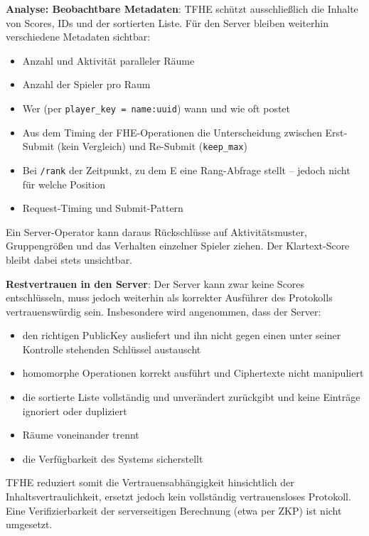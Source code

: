 \textbf{Analyse: Beobachtbare Metadaten}:
TFHE schützt ausschließlich die Inhalte von Scores, IDs und der sortierten Liste. Für den Server bleiben weiterhin verschiedene Metadaten sichtbar:
\begin{itemize}
    \item Anzahl und Aktivität paralleler Räume
    \item Anzahl der Spieler pro Raum
    \item Wer (per \texttt{player\_key = name:uuid}) wann und wie oft postet
    \item Aus dem Timing der FHE-Operationen die Unterscheidung zwischen Erst-Submit (kein Vergleich) und Re-Submit (\texttt{keep\_max})
    \item Bei \texttt{/rank} der Zeitpunkt, zu dem E eine Rang-Abfrage stellt -- jedoch nicht für welche Position
    \item Request-Timing und Submit-Pattern
\end{itemize}

Ein Server-Operator kann daraus Rückschlüsse auf Aktivitätsmuster, Gruppengrößen und das Verhalten einzelner Spieler ziehen. Der Klartext-Score bleibt dabei stets unsichtbar.

\textbf{Restvertrauen in den Server}:
Der Server kann zwar keine Scores entschlüsseln, muss jedoch weiterhin als korrekter Ausführer des Protokolls vertrauenswürdig sein. Insbesondere wird angenommen, dass der Server:
\begin{itemize}
    \item den richtigen PublicKey ausliefert und ihn nicht gegen einen unter seiner Kontrolle stehenden Schlüssel austauscht
    \item homomorphe Operationen korrekt ausführt und Ciphertexte nicht manipuliert
    \item die sortierte Liste vollständig und unverändert zurückgibt und keine Einträge ignoriert oder dupliziert
    \item Räume voneinander trennt
    \item die Verfügbarkeit des Systems sicherstellt
\end{itemize}

TFHE reduziert somit die Vertrauensabhängigkeit hinsichtlich der Inhaltsvertraulichkeit, ersetzt jedoch kein vollständig vertrauensloses Protokoll. Eine Verifizierbarkeit der serverseitigen Berechnung (etwa per ZKP) ist nicht umgesetzt.


